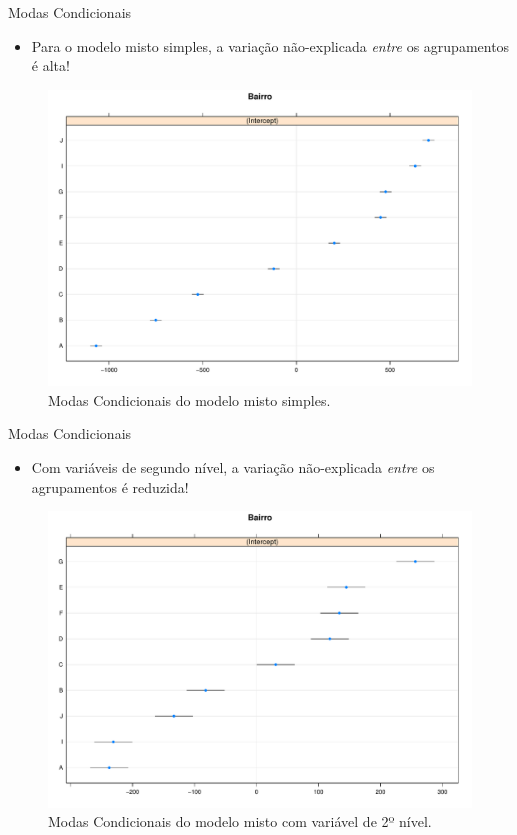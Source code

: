 \documentclass[9pt,ignorenonframetext,aspectratio=169]{beamer}
\providecommand{\tightlist}{%
  \setlength{\itemsep}{0pt}\setlength{\parskip}{0pt}}
\begin{document}
\begin{frame}{Modas Condicionais}
\protect\hypertarget{modas-condicionais}{}

\begin{itemize}[<+->]
\tightlist
\item
  Para o modelo misto simples, a variação não-explicada \emph{entre} os
  agrupamentos é alta!
\end{itemize}

\begin{figure}

{\centering \includegraphics[width=0.6\linewidth]{index_files/figure-beamer/unnamed-chunk-10-1} 

}

\caption{Modas Condicionais do modelo misto simples.}\label{fig:unnamed-chunk-10}
\end{figure}

\end{frame}

\begin{frame}{Modas Condicionais}
\protect\hypertarget{modas-condicionais-1}{}

\begin{itemize}[<+->]
\tightlist
\item
  Com variáveis de segundo nível, a variação não-explicada \emph{entre}
  os agrupamentos é reduzida!
\end{itemize}

\begin{figure}

{\centering \includegraphics[width=0.6\linewidth]{index_files/figure-beamer/unnamed-chunk-11-1} 

}

\caption{Modas Condicionais do modelo misto com variável de 2º nível.}\label{fig:unnamed-chunk-11}
\end{figure}

\end{frame}
\end{document}
